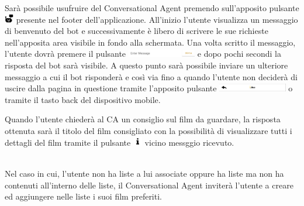 \documentclass[a4paper, 10pt]{report}
\begin{document}
        Sarà possibile usufruire del Conversational Agent premendo sull'apposito pulsante \includegraphics[width=0.4cm]{deployment/icona_chatbot.png}
        presente nel footer dell'applicazione.
        All'inizio l'utente visualizza un messaggio di benvenuto del bot e successivamente è libero di scrivere le sue
        richieste nell'apposita area visibile in fondo alla schermata. Una volta scritto il messaggio, l'utente dovrà premere il pulsante
        \includegraphics[width=3cm]{deployment/tasto_invia.png} e dopo pochi secondi la risposta del bot sarà visibile.
        A questo punto sarà possibile inviare un ulteriore messaggio a cui il bot risponderà e così via fino a quando l'utente non deciderà
        di uscire dalla pagina in questione tramite l'apposito pulsante \includegraphics[width=3cm]{deployment/tasto_back.png}
        o tramite il tasto back del dispositivo mobile.

        Quando l'utente chiederà al CA un consiglio sul film da guardare, la risposta ottenuta sarà il titolo del film consigliato
        con la possibilità di visualizzare tutti i dettagli del film tramite il pulsante
        \includegraphics[width=0.4cm]{deployment/icona_information.png} vicino messggio ricevuto.

        \\Nel caso in cui, l'utente non ha liste a lui associate oppure ha liste ma non ha contenuti all'interno delle liste,
        il Conversational Agent inviterà l'utente a creare ed aggiungere nelle liste i suoi film preferiti.
\end{document}
